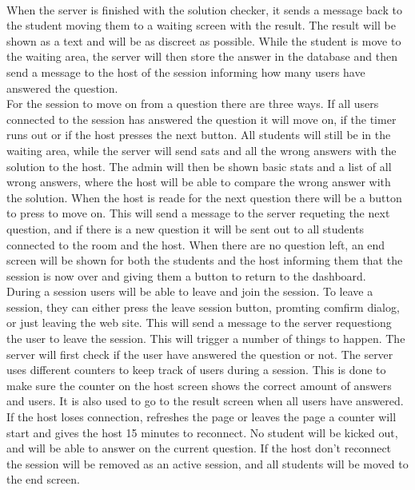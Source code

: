 \\[11pt]
When the server is finished with the solution checker, it sends a message back to the student moving them to a waiting screen with the result. The result will be shown as a text and will be as discreet as possible. While the student is move to the waiting area, the server will then store the answer in the database and then send a message to the host of the session informing how many users have answered the question.
\\[11pt]
For the session to move on from a question there are three ways. If all users connected to the session has answered the question it will move on, if the timer runs out or if the host presses the next button. All students will still be in the waiting area, while the server will send sats and all the wrong answers with the solution to the host. The admin will then be shown basic stats and a list of all wrong answers, where the host will be able to compare the wrong answer with the solution. When the host is reade for the next question there will be a button to press to move on. This will send a message to the server requeting the next question, and if there is a new question it will be sent out to all students connected to the room and the host. When there are no question left, an end screen will be shown for both the students and the host informing them that the session is now over and giving them a button to return to the dashboard.
\\[11pt]
During a session users will be able to leave and join the session. To leave a session, they can either press the leave session button, promting comfirm dialog, or just leaving the web site. This will send a message to the server requestiong the user to leave the session. This will trigger a number of things to happen. The server will first check if the user have answered the question or not. The server uses different counters to keep track of users during a session. This is done to make sure the counter on the host screen shows the correct amount of answers and users. It is also used to go to the result screen when all users have answered. If the host loses connection, refreshes the page or leaves the page a counter will start and gives the host 15 minutes to reconnect. No student will be kicked out, and will be able to answer on the current question. If the host don't reconnect the session will be removed as an active session, and all students will be moved to the end screen.